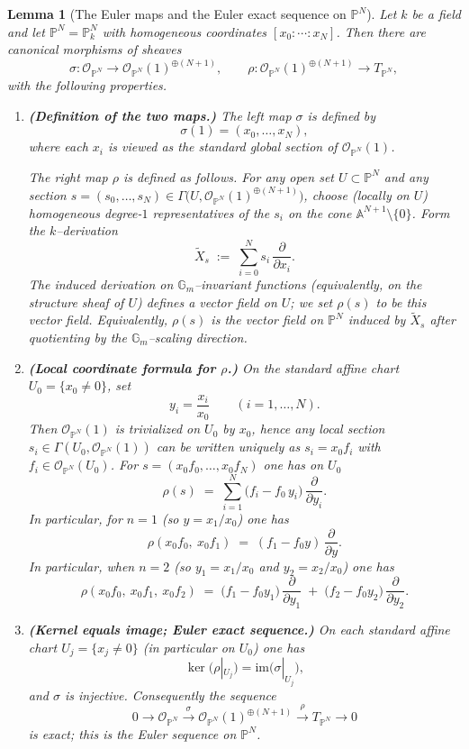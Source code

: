 \documentclass[11pt,twoside]{amsart}
\theoremstyle{plain}
\numberwithin{equation}{section}
\newtheorem{lemma}[theorem]{Lemma}
\theoremstyle{definition}
\newcommand{\PP}{\mathbb{P}}
\newcommand{\OO}{\mathcal{O}}
\newcommand{\Gm}{\mathbb{G}_m}
\begin{document}
\begin{lemma}[The Euler maps and the Euler exact sequence on $\PP^N$]\label{lem:Euler-sequence-maps}
Let $k$ be a field and let $\PP^N=\PP^N_k$ with homogeneous coordinates
$[x_0:\cdots:x_N]$.  Then there are canonical morphisms of sheaves
\[
\sigma:\OO_{\PP^N}\longrightarrow \OO_{\PP^N}(1)^{\oplus (N+1)},
\qquad
\rho:\OO_{\PP^N}(1)^{\oplus (N+1)}\longrightarrow T_{\PP^N},
\]
with the following properties.

\begin{enumerate}
\item[(i)] \textbf{(Definition of the two maps.)}
The left map $\sigma$ is defined by
\[
\sigma(1)=(x_0,\dots,x_N),
\]
where each $x_i$ is viewed as the standard global section of $\OO_{\PP^N}(1)$.

The right map $\rho$ is defined as follows.  For any open set $U\subset \PP^N$ and
any section $s=(s_0,\dots,s_N)\in \Gamma\!\big(U,\OO_{\PP^N}(1)^{\oplus(N+1)}\big)$,
choose (locally on $U$) homogeneous degree-$1$ representatives of the $s_i$ on the
cone $\mathbb{A}^{N+1}\setminus\{0\}$.  Form the $k$--derivation
\[
\widetilde{X}_s \;:=\; \sum_{i=0}^N s_i\,\frac{\partial}{\partial x_i}.
\]
The induced derivation on $\Gm$--invariant functions (equivalently, on the structure
sheaf of $U$) defines a vector field on $U$; we set $\rho(s)$ to be this vector field.
Equivalently, $\rho(s)$ is the vector field on $\PP^N$ induced by $\widetilde{X}_s$
after quotienting by the $\Gm$--scaling direction.

\item[(ii)] \textbf{(Local coordinate formula for $\rho$.)}
On the standard affine chart $U_0=\{x_0\neq 0\}$, set
\[
y_i=\frac{x_i}{x_0}\qquad (i=1,\dots,N).
\]
Then $\OO_{\PP^N}(1)$ is trivialized on $U_0$ by $x_0$, hence any local section
$s_i\in \Gamma(U_0,\OO_{\PP^N}(1))$ can be written uniquely as $s_i=x_0 f_i$ with
$f_i\in \OO_{\PP^N}(U_0)$.  For $s=(x_0 f_0,\dots,x_0 f_N)$ one has on $U_0$
\[
\rho(s)
\;=\;
\sum_{i=1}^N \bigl(f_i-f_0\,y_i\bigr)\,\frac{\partial}{\partial y_i}.
\]
In particular, for $n=1$ (so $y=x_1/x_0$) one has
\[
\rho(x_0 f_0,\ x_0 f_1) \;=\; (f_1-f_0 y)\,\frac{\partial}{\partial y}.
\]
In particular, when $n=2$ (so $y_1=x_1/x_0$ and $y_2=x_2/x_0$) one has
\[
\rho(x_0 f_0,\ x_0 f_1,\ x_0 f_2)
\;=\;
\bigl(f_1-f_0 y_1\bigr)\,\frac{\partial}{\partial y_1}
\;+\;
\bigl(f_2-f_0 y_2\bigr)\,\frac{\partial}{\partial y_2}.
\]
\item[(iii)] \textbf{(Kernel equals image; Euler exact sequence.)}
On each standard affine chart $U_j=\{x_j\neq 0\}$ (in particular on $U_0$) one has
\[
\ker\!\bigl(\rho|_{U_j}\bigr)=\mathrm{im}\!\bigl(\sigma|_{U_j}\bigr),
\]
and $\sigma$ is injective.  Consequently the sequence
\[
0\longrightarrow \OO_{\PP^N}
\xrightarrow{\ \sigma\ }
\OO_{\PP^N}(1)^{\oplus(N+1)}
\xrightarrow{\ \rho\ }
T_{\PP^N}
\longrightarrow 0
\]
is exact; this is the Euler sequence on $\PP^N$.
\end{enumerate}
\end{lemma}
\end{document}
